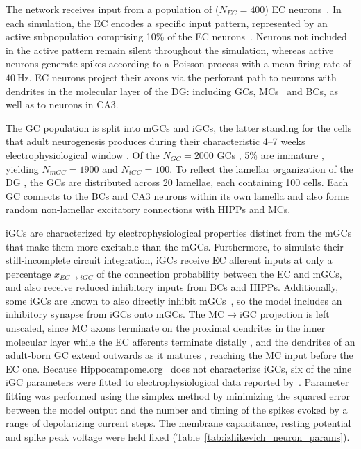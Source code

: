 \documentclass[pdflatex,sn-basic]{sn-jnl}%
\theoremstyle{thmstyleone}%
\theoremstyle{thmstyletwo}%
\theoremstyle{thmstylethree}%
\begin{document}
The network receives input from a population of ($N_{EC} = 400$) EC neurons~\citep{amaralChapter1990,
kimAdult2024}. In each simulation, the EC encodes a specific input pattern, represented by an active subpopulation comprising 10\%
of the EC neurons~\citep{mcnaughtonDead1991}. Neurons not included in the active pattern remain silent throughout the simulation,
whereas active neurons generate spikes according to a Poisson process with a mean firing rate of $\SI{40}{\hertz}$. EC neurons
project their axons via the perforant path to neurons with dendrites in the molecular layer of the DG\@: including GCs,
MCs~\citep{scharfmanHilar2013} and BCs, as well as to neurons in CA3.

The GC population is split into mGCs and iGCs, the latter standing for the cells that adult neurogenesis produces during their
characteristic 4--7 weeks electrophysiological window \citep{aimoneRegulation2014}. Of the $N_{GC} = 2000$ GCs
\citep{westUnbiased1991}, 5\% are immature \citep{cameronAdult2001}, yielding $N_{mGC} = 1900$ and $N_{iGC} = 100$. To reflect the
lamellar organization of the DG \citep{sloviterUpdating2012}, the GCs are distributed across 20 lamellae, each containing 100
cells. Each GC connects to the BCs and CA3 neurons within its own lamella and also forms random non-lamellar excitatory
connections with HIPPs and MCs.

iGCs are characterized by electrophysiological properties distinct from the mGCs that make them more excitable than the mGCs.
Furthermore, to simulate their still-incomplete circuit integration, iGCs receive EC afferent inputs at only a percentage $x_{EC
\to iGC}$ of the connection probability between the EC and mGCs, and also receive reduced inhibitory inputs from BCs and HIPPs.
Additionally, some iGCs are known to also directly inhibit mGCs~\citep{lunaAdultborn2019}, so the model includes an inhibitory
synapse from iGCs onto mGCs. The MC$\to$iGC projection is left unscaled, since MC axons terminate on the proximal dendrites in the
inner molecular layer while the EC afferents terminate distally \citep{amaralDentate2007}, and the dendrites of an adult-born GC
extend outwards as it matures \citep{zhaoDistinct2006}, reaching the MC input before the EC one.  Because
Hippocampome.org~\citep{wheelerHippocampomeorg2023} does not characterize iGCs, six of the nine iGC parameters were fitted to
electrophysiological data reported by~\citet{espositoNeuronal2005}. Parameter fitting was performed using the
\citet{nelderSimplex1965} simplex method by minimizing the squared error between the model output and the number and timing of the
spikes evoked by a range of depolarizing current steps. The membrane capacitance, resting potential and spike peak voltage were
held fixed (Table~\ref{tab:izhikevich_neuron_params}).
\end{document}
